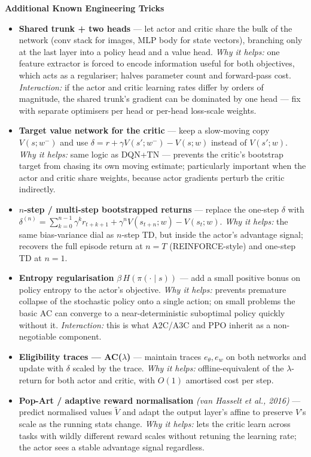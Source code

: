 \documentclass[11pt]{article}
\begin{document}
    \label{tricks-4-2}

    \textbf{Additional Known Engineering Tricks}

\begin{itemize}
\item
  \label{trick-4-2-1}\textbf{Shared trunk + two heads}
  --- let actor and critic share the bulk of the network (conv stack for
  images, MLP body for state vectors), branching only at the last layer
  into a policy head and a value head. \emph{Why it helps:} one feature
  extractor is forced to encode information useful for both objectives,
  which acts as a regulariser; halves parameter count and forward-pass
  cost. \emph{Interaction:} if the actor and critic learning rates
  differ by orders of magnitude, the shared trunk's gradient can be
  dominated by one head --- fix with separate optimisers per head or
  per-head loss-scale weights.
\item
  \label{trick-4-2-2}\textbf{Target value network for the
  critic} --- keep a slow-moving copy \(V(s;w^-)\) and use
  \(\delta = r + \gamma V(s';w^-) - V(s;w)\) instead of \(V(s';w)\).
  \emph{Why it helps:} same logic as DQN+TN --- prevents the critic's
  bootstrap target from chasing its own moving estimate; particularly
  important when the actor and critic share weights, because actor
  gradients perturb the critic indirectly.
\item
  \label{trick-4-2-3}\textbf{\(n\)-step / multi-step
  bootstrapped returns} --- replace the one-step \(\delta\) with
  \(\delta^{(n)} = \sum_{k=0}^{n-1}\gamma^k r_{t+k+1} + \gamma^n V(s_{t+n};w) - V(s_t;w)\).
  \emph{Why it helps:} the same bias-variance dial as \(n\)-step TD, but
  inside the actor's advantage signal; recovers the full episode return
  at \(n=T\) (REINFORCE-style) and one-step TD at \(n=1\).
\item
  \label{trick-4-2-4}\textbf{Entropy regularisation}
  \(\beta\,H(\pi(\cdot\mid s))\) --- add a small positive bonus on
  policy entropy to the actor's objective. \emph{Why it helps:} prevents
  premature collapse of the stochastic policy onto a single action; on
  small problems the basic AC can converge to a near-deterministic
  suboptimal policy quickly without it. \emph{Interaction:} this is what
  A2C/A3C and PPO inherit as a non-negotiable component.
\item
  \label{trick-4-2-5}\textbf{Eligibility traces ---
  AC(\(\lambda\))} --- maintain traces \(e_\theta, e_w\) on both
  networks and update with \(\delta\) scaled by the trace. \emph{Why it
  helps:} offline-equivalent of the \(\lambda\)-return for both actor
  and critic, with \(O(1)\) amortised cost per step.
\item
  \label{trick-4-2-6}\textbf{Pop-Art / adaptive reward
  normalisation} \emph{(van Hasselt et al., 2016)} --- predict
  normalised values \(\tilde V\) and adapt the output layer's affine to
  preserve \(V\)'s scale as the running stats change. \emph{Why it
  helps:} lets the critic learn across tasks with wildly different
  reward scales without retuning the learning rate; the actor sees a
  stable advantage signal regardless.
\end{itemize}
\end{document}
